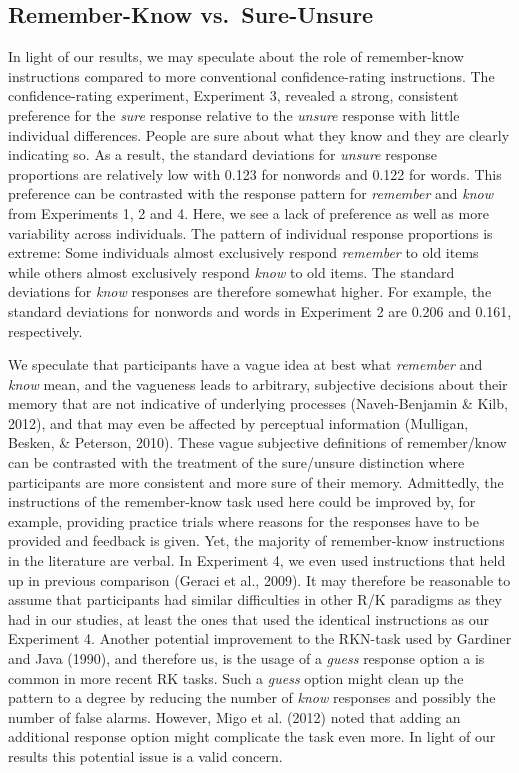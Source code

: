 \documentclass[english,,man,floatsintext]{apa6}
\begin{document}
\hypertarget{remember-know-vs.-sure-unsure}{%
\subsection{Remember-Know vs.~Sure-Unsure}\label{remember-know-vs.-sure-unsure}}

In light of our results, we may speculate about the role of remember-know instructions compared to more conventional confidence-rating instructions. The confidence-rating experiment, Experiment 3, revealed a strong, consistent preference for the \emph{sure} response relative to the \emph{unsure} response with little individual differences. People are sure about what they know and they are clearly indicating so. As a result, the standard deviations for \emph{unsure} response proportions are relatively low with 0.123 for nonwords and 0.122 for words. This preference can be contrasted with the response pattern for \emph{remember} and \emph{know} from Experiments 1, 2 and 4. Here, we see a lack of preference as well as more variability across individuals. The pattern of individual response proportions is extreme: Some individuals almost exclusively respond \emph{remember} to old items while others almost exclusively respond \emph{know} to old items. The standard deviations for \emph{know} responses are therefore somewhat higher. For example, the standard deviations for nonwords and words in Experiment 2 are 0.206 and 0.161, respectively.

We speculate that participants have a vague idea at best what \emph{remember} and \emph{know} mean, and the vagueness leads to arbitrary, subjective decisions about their memory that are not indicative of underlying processes (Naveh-Benjamin \& Kilb, 2012), and that may even be affected by perceptual information (Mulligan, Besken, \& Peterson, 2010). These vague subjective definitions of remember/know can be contrasted with the treatment of the sure/unsure distinction where participants are more consistent and more sure of their memory. Admittedly, the instructions of the remember-know task used here could be improved by, for example, providing practice trials where reasons for the responses have to be provided and feedback is given. Yet, the majority of remember-know instructions in the literature are verbal. In Experiment 4, we even used instructions that held up in previous comparison (Geraci et al., 2009). It may therefore be reasonable to assume that participants had similar difficulties in other R/K paradigms as they had in our studies, at least the ones that used the identical instructions as our Experiment 4. Another potential improvement to the RKN-task used by Gardiner and Java (1990), and therefore us, is the usage of a \emph{guess} response option a is common in more recent RK tasks. Such a \emph{guess} option might clean up the pattern to a degree by reducing the number of \emph{know} responses and possibly the number of false alarms. However, Migo et al. (2012) noted that adding an additional response option might complicate the task even more. In light of our results this potential issue is a valid concern.
\end{document}
